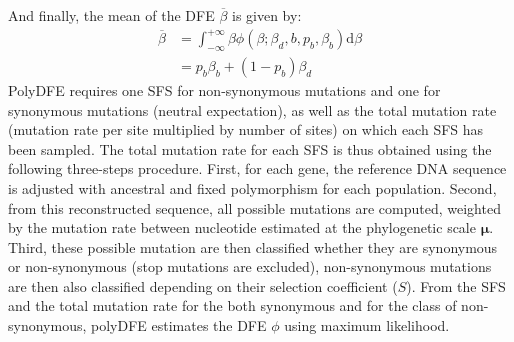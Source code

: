\documentclass{article}
\newcommand{\UniDimArray}[1]{\bm{#1}}
\newcommand{\der}{\mathrm{d}}
\newcommand{\Spop}{\beta}
\newcommand{\SpopMean}{\overline{\Spop}}
\newcommand{\Sphy}{S}
\begin{document}
    And finally, the mean of the DFE $\overline{\Spop}$ is given by:
    \begin{align*}
        \SpopMean & = \int_{-\infty}^{+\infty} \Spop \phi \left( \Spop; \Spop_d , b, p_b, \Spop_b \right) \der \Spop \\
        & =  p_b \Spop_b + \left( 1 - p_b \right) \Spop_d
    \end{align*}
    PolyDFE requires one SFS for non-synonymous mutations and one for synonymous mutations (neutral expectation), as well as the total mutation rate (mutation rate per site multiplied by number of sites) on which each SFS has been sampled.
    The total mutation rate for each SFS is thus obtained using the following three-steps procedure.
    First, for each gene, the reference DNA sequence is adjusted with ancestral and fixed polymorphism for each population.
    Second, from this reconstructed sequence, all possible mutations are computed, weighted by the mutation rate between nucleotide estimated at the phylogenetic scale $\UniDimArray{\mu}$.
    Third, these possible mutation are then classified whether they are synonymous or non-synonymous (stop mutations are excluded), non-synonymous mutations are then also classified depending on their selection coefficient ($\Sphy$).
    From the SFS and the total mutation rate for the both synonymous and for the class of non-synonymous, polyDFE estimates the DFE $\phi$ using maximum likelihood.

    \printbibliography
\end{document}
